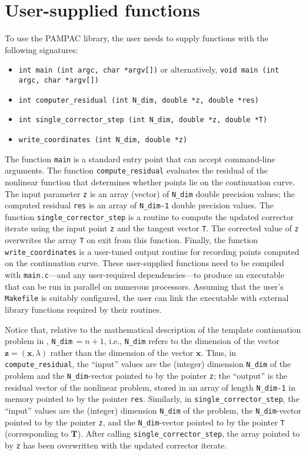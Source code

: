 \documentclass{article}
\renewcommand{\vec}[1]{{\mathbf{#1}}}
\newcommand{\pampac}{\textsc{PAMPAC}\xspace}
\begin{document}
\section*{User-supplied functions}

To use the \pampac library, the user needs to supply functions with the following signatures:
\begin{itemize}
%
\item[] \verb^int main (int argc, char *argv[])^ or alternatively, \newline
        \verb^void main (int argc, char *argv[])^
\item[] \verb^int computer_residual (int N_dim, double *z, double *res)^ 
\item[] \verb^int single_corrector_step (int N_dim, double *z, double *T)^ 
\item[] \verb^write_coordinates (int N_dim, double *z)^
\end{itemize}
%
The function \verb.main. is a standard entry point that can accept command-line arguments.
%
The function \verb^compute_residual^ evaluates the residual of the nonlinear function that
determines whether points lie on the continuation curve.
%
The input parameter \texttt{z} is an array (vector) of \texttt{N\_dim} double precision values;
the computed residual \texttt{res} is an array of \texttt{N\_dim-1} double precision values.
%
The function \verb^single_corrector_step^ is a routine to compute the updated corrector iterate
using the input point \texttt{z} and the tangent vector \texttt{T}.
%
The corrected value of \texttt{z} overwrites the array \texttt{T} on exit from this function.
%
Finally, the function \verb.write_coordinates. is a user-tuned output routine for recording
points computed on the continuation curve.
%
These user-supplied functions need to be compiled with \texttt{main.c}---and any user-required dependencies---to
produce an executable that can be run in parallel on numerous processors.
%
Assuming that the user's \texttt{Makefile} is suitably configured, the user can link the executable with external library functions required by their routines.

%
Notice that, relative to the mathematical description of the template continuation problem in \cite{aruliah}, \verb^N_dim^$\,= n+1$, i.e., \verb^N_dim^ refers to the dimension of the vector $\vec{z}=(\vec{x},\lambda)$ rather than the dimension of the vector $\vec{x}$.
%
Thus, in \verb^compute_residual^, the ``input'' values are the (integer) dimension \verb^N_dim^ of the problem and the \verb^N_dim^-vector pointed to by the pointer \verb^z^;
the ``output'' is the residual vector of the nonlinear problem, stored in an
array of length \verb^N_dim-1^ in memory pointed to by 
the pointer \verb^res^.
%
Similarly, in \verb^single_corrector_step^, the ``input'' values are the (integer) dimension \verb^N_dim^ of the problem, the \verb^N_dim^-vector pointed to by the pointer \verb^z^, and the \verb^N_dim^-vector pointed to by the pointer \verb^T^ (corresponding to $\vec{T}$).
%
After calling  \verb^single_corrector_step^, the array pointed to by \verb^z^ has been overwritten with the updated corrector iterate.
%
\end{document}
